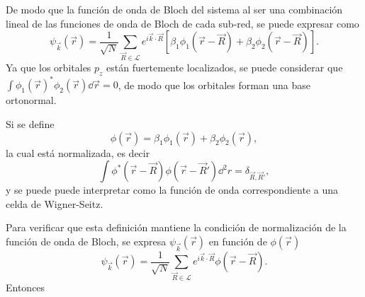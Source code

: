De modo que la función de onda de Bloch del sistema al ser una combinación lineal de las funciones de onda de Bloch de cada sub-red, se puede expresar como
\begin{equation}
	\psi_{\vec{k}}(\vec{r}) = \frac{1}{\sqrt{N}}\sum_{\vec{R}\in \mathcal{L}} e^{i \vec{k}\cdot \vec{R}}\left[\beta_1\phi_1(\vec{r} - \vec{R}) + \beta_2\phi_2(\vec{r} - \vec{R})\right].\label{eq:wavegraphene}
\end{equation}
Ya que los orbitales $p_z$ están fuertemente localizados, se puede considerar que $\int \phi_1(\vec{r})^{\ast}\phi_2(\vec{r}) \dd \vec{r} = 0$, de modo que los orbitales forman una base ortonormal.\par 
Si se define
\begin{equation}
	\phi(\vec{r}) = \beta_1 \phi_1(\vec{r}) + \beta_2\phi_2(\vec{r}),\label{eq:waveindiv}
\end{equation}
la cual está normalizada, es decir 
\begin{equation}
	\int \phi^{\ast}(\vec{r}-\vec{R})\phi(\vec{r} - \vec{R}') \dd^2 r = \delta_{\vec{R},\vec{R}'},
\end{equation}
y se puede puede interpretar como la función de onda correspondiente a una celda de Wigner-Seitz.\par
Para verificar que esta definición mantiene la condición de normalización de la función de onda de Bloch, se expresa $\psi_{\vec{k}}(\vec{r})$ en función de $\phi(\vec{r})$
\begin{equation}
   \psi_{\vec{k}}(\vec{r}) = \frac{1}{\sqrt{N}} \sum_{\vec{R} \in \mathcal{L}} e^{i \vec{k}\cdot \vec{R}} \phi(\vec{r} - \vec{R}).
\end{equation}
Entonces
